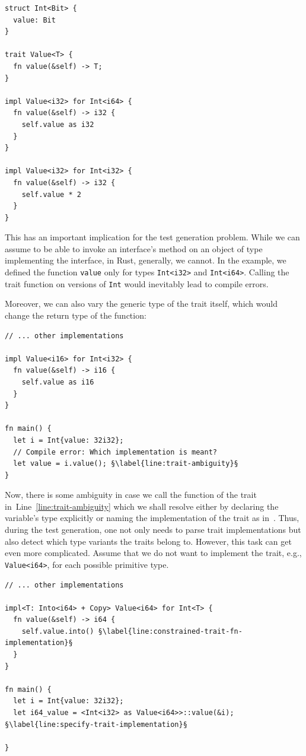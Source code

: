 \documentclass[paper=a4,%
  twoside,%
  BCOR4mm,%
  abstract=true,%
  toc=bibliography,%
  chapterprefix=true,%
  toc=bibliographynumbered,%
  open=right,%
  english,%
  pagesize=pdftex]{scrreprt}
\begin{document}
\begin{lstlisting}[style=boxed, caption={A struct providing multiple implementations for the same struct}, label=lst:multiple-trait-implementations]
struct Int<Bit> {
  value: Bit
}

trait Value<T> {
  fn value(&self) -> T;
}

impl Value<i32> for Int<i64> {
  fn value(&self) -> i32 {
    self.value as i32
  }
}

impl Value<i32> for Int<i32> {
  fn value(&self) -> i32 {
    self.value * 2
  }
}
\end{lstlisting}

This has an important implication for the test generation problem. While we can assume to be able to invoke an interface's method on an object of type implementing the interface, in Rust, generally, we cannot. In the example, we defined the function \texttt{value} only for types \texttt{Int<i32>} and \texttt{Int<i64>}. Calling the trait function on versions of \texttt{Int} would inevitably lead to compile errors.

Moreover, we can also vary the generic type of the trait itself, which would change the return type of the function:

\begin{lstlisting}[style=boxed, caption={}, label=lst:multiple-trait-implementations-extended, escapechar=§]
// ... other implementations

impl Value<i16> for Int<i32> {
  fn value(&self) -> i16 {
    self.value as i16
  }
}

fn main() {
  let i = Int{value: 32i32};
  // Compile error: Which implementation is meant?
  let value = i.value(); §\label{line:trait-ambiguity}§
}
\end{lstlisting}

Now, there is some ambiguity in case we call the function of the trait in~Line~\ref{line:trait-ambiguity} which we shall resolve either by declaring the variable's type explicitly or naming the implementation of the trait as in~. Thus, during the test generation, one not only needs to parse trait implementations but also detect which type variants the traits belong to. However, this task can get even more complicated. Assume that we do not want to implement the trait, e.g., \texttt{Value<i64>}, for each possible primitive type.

\begin{lstlisting}[style=boxed, caption={Trait implementation for generic \texttt{Int}}, label=lst:constrained-trait-implementation2, escapechar=§]
// ... other implementations

impl<T: Into<i64> + Copy> Value<i64> for Int<T> {
  fn value(&self) -> i64 {
    self.value.into() §\label{line:constrained-trait-fn-implementation}§
  }
}

fn main() {
  let i = Int{value: 32i32};
  let i64_value = <Int<i32> as Value<i64>>::value(&i); §\label{line:specify-trait-implementation}§

}
\end{lstlisting}
\end{document}
